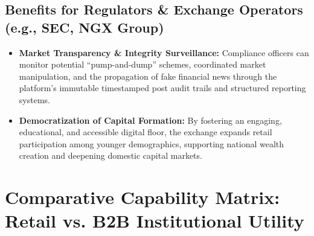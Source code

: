 \documentclass[11pt,a4paper]{article}
\begin{document}
\subsection{Benefits for Regulators \& Exchange Operators (e.g., SEC, NGX Group)}
\begin{itemize}
    \item \textbf{Market Transparency \& Integrity Surveillance:} Compliance officers can monitor potential ``pump-and-dump'' schemes, coordinated market manipulation, and the propagation of fake financial news through the platform's immutable timestamped post audit trails and structured reporting systems.
    \item \textbf{Democratization of Capital Formation:} By fostering an engaging, educational, and accessible digital floor, the exchange expands retail participation among younger demographics, supporting national wealth creation and deepening domestic capital markets.
\end{itemize}

\section{Comparative Capability Matrix: Retail vs. B2B Institutional Utility}
\end{document}
